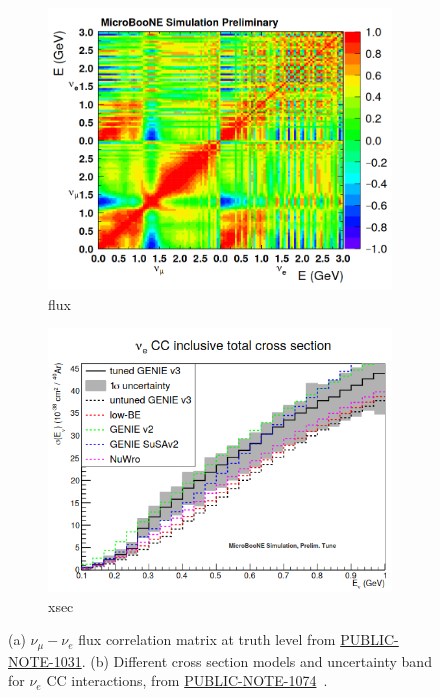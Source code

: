 \begin{figure}[ht] 
\begin{center}
    \begin{subfigure}[b]{0.42\textwidth}
    \centering
    \includegraphics[width=1.00\textwidth]{introduction/fluxcorrelation.png}
    \caption{\label{fig:numuconstraint:flux} flux}
    \end{subfigure}
    \begin{subfigure}[b]{0.45\textwidth}
    \centering
    \includegraphics[width=1.00\textwidth]{introduction/lowexsec.png}
    \caption{\label{fig:numuconstraint:xsec} xsec}
    \end{subfigure}
\caption{\label{fig:numuconstraint} (a) $\nu_{\mu}-\nu_e$ flux correlation matrix at truth level from \href{https://microboone.fnal.gov/wp-content/uploads/MICROBOONE-NOTE-1031-PUB.pdf}{PUBLIC-NOTE-1031}. (b) Different cross section models and uncertainty band for $\nu_e$ CC interactions, from \href{https://microboone.fnal.gov/wp-content/uploads/MICROBOONE-NOTE-1074-PUB.pdf}{PUBLIC-NOTE-1074}~\cite{bib:1074}.}
\end{center}
\end{figure}

